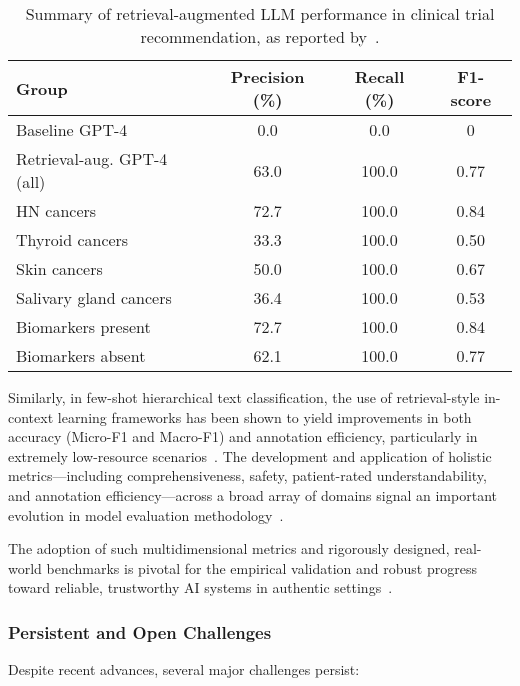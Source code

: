 \documentclass[sigconf]{acmart}
\begin{document}
\begin{table*}[htbp]
\centering
\caption{Summary of retrieval-augmented LLM performance in clinical trial recommendation, as reported by~\cite{ref53}.}
\label{tab:clinical_trial_results}
\begin{adjustbox}{max width=\textwidth}
\begin{tabular}{@{}lccc@{}}
\toprule
Group & Precision (\%) & Recall (\%) & F1-score \\
\midrule
Baseline GPT-4 & 0.0 & 0.0 & 0 \\
Retrieval-aug. GPT-4 (all) & 63.0 & 100.0 & 0.77 \\
HN cancers & 72.7 & 100.0 & 0.84 \\
Thyroid cancers & 33.3 & 100.0 & 0.50 \\
Skin cancers & 50.0 & 100.0 & 0.67 \\
Salivary gland cancers & 36.4 & 100.0 & 0.53 \\
Biomarkers present & 72.7 & 100.0 & 0.84 \\
Biomarkers absent & 62.1 & 100.0 & 0.77 \\
\bottomrule
\end{tabular}
\end{adjustbox}
\end{table*}

Similarly, in few-shot hierarchical text classification, the use of retrieval-style in-context learning frameworks has been shown to yield improvements in both accuracy (Micro-F1 and Macro-F1) and annotation efficiency, particularly in extremely low-resource scenarios~\cite{ref16}. The development and application of holistic metrics---including comprehensiveness, safety, patient-rated understandability, and annotation efficiency---across a broad array of domains signal an important evolution in model evaluation methodology~\cite{ref16,ref29,ref32,ref50,ref53,ref54,ref55}.

The adoption of such multidimensional metrics and rigorously designed, real-world benchmarks is pivotal for the empirical validation and robust progress toward reliable, trustworthy AI systems in authentic settings~\cite{ref8,ref32,ref55}.

\subsubsection{Persistent and Open Challenges}

Despite recent advances, several major challenges persist:
\end{document}
